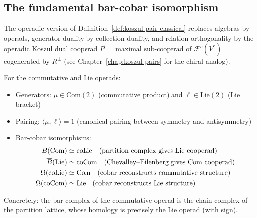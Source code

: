 \subsection{The fundamental bar-cobar isomorphism}

\begin{remark}
The operadic version of Definition~\ref{def:koszul-pair-classical} replaces algebras by operads, generator duality by collection duality, and relation orthogonality by the operadic Koszul dual cooperad $P^! = \text{maximal sub-cooperad of } \mathcal{F}^c(V^*)$ cogenerated by $R^\perp$ (see Chapter~\ref{chap:koszul-pairs} for the chiral analog).
\end{remark}

\begin{example}
For the commutative and Lie operads:
\begin{itemize}
\item Generators: $\mu \in \text{Com}(2)$ (commutative product) and $\ell \in \text{Lie}(2)$ (Lie bracket)
\item Pairing: $\langle \mu, \ell \rangle = 1$ (canonical pairing between symmetry and antisymmetry)
\item Bar-cobar isomorphisms:
\begin{align*}
\overline{B}(\text{Com}) &\simeq \text{co}\text{Lie} \quad \text{(partition complex gives Lie cooperad)} \\
\overline{B}(\text{Lie}) &\simeq \text{co}\text{Com} \quad \text{(Chevalley--Eilenberg gives Com cooperad)} \\
\Omega(\text{co}\text{Lie}) &\simeq \text{Com} \quad \text{(cobar reconstructs commutative structure)} \\
\Omega(\text{co}\text{Com}) &\simeq \text{Lie} \quad \text{(cobar reconstructs Lie structure)}
\end{align*}
\end{itemize}

Concretely: the bar complex of the commutative operad is the chain complex of the partition lattice, whose homology is precisely the Lie operad (with sign).
\end{example}

